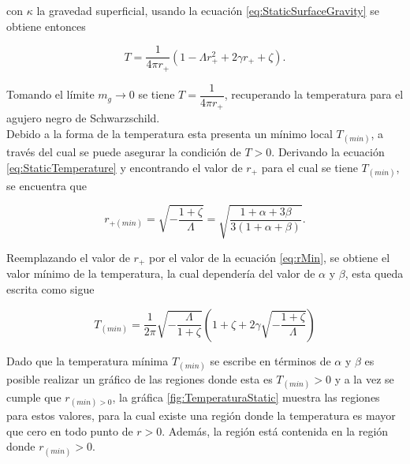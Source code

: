 con $\kappa$ la gravedad superficial, usando la ecuación \eqref{eq:StaticSurfaceGravity} se obtiene entonces

\begin{equation}
    T=\dfrac{1}{4\pi r_+}\left(1-\Lambda r_+^2+2\gamma r_++\zeta\right).
    \label{eq:StaticTemperature}
\end{equation}

Tomando el límite $m_g\rightarrow 0$ se tiene $T=\dfrac{1}{4\pi r_+}$, recuperando la temperatura para el agujero negro de Schwarzschild.\\ 

Debido a la forma de la temperatura esta presenta un mínimo local $T_{(min)}$, a través del cual se puede asegurar la condición de $T>0$. Derivando la ecuación \eqref{eq:StaticTemperature} y encontrando el valor de $r_+$ para el cual se tiene $T_{(min)}$, se encuentra que

\begin{equation}
    r_{+(min)}=\sqrt{-\dfrac{1+\zeta}{\Lambda}}=\sqrt{\dfrac{1+\alpha+3\beta}{3(1+\alpha+\beta)}}.
    \label{eq:rMin}
\end{equation}

Reemplazando el valor de $r_+$ por el valor de la ecuación \eqref{eq:rMin}, se obtiene el valor mínimo de la temperatura, la cual dependería del valor de $\alpha$ y $\beta$, esta queda escrita como sigue

\begin{equation}
    T_{(min)}=\dfrac{1}{2\pi}\sqrt{-\dfrac{\Lambda}{1+\zeta}}\left(1+\zeta+2\gamma\sqrt{-\dfrac{1+\zeta}{\Lambda}}\right)
\end{equation}

Dado que la temperatura mínima $T_{(min)}$ se escribe en términos de $\alpha$ y $\beta$ es posible realizar un gráfico de las regiones donde esta es $T_{(min)}>0$ y a la vez se cumple que $r_{(min)>0}$, la gráfica \ref{fig:TemperaturaStatic} muestra las regiones para estos valores, para la cual existe una región donde la temperatura es mayor que cero en todo punto de $r>0$. Además, la región está contenida en la región donde $r_{(min)}>0$.

